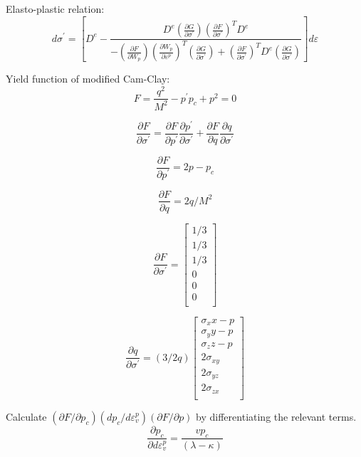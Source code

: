 \documentclass[a4paper,12pt]{article}
\begin{document}
Elasto-plastic relation:
\begin{equation*}
d\sigma^\prime = \left[D^e - \frac{D^e\left(\frac{\partial G}{\partial \sigma^\prime}\right)\left(\frac{\partial F}{\partial \sigma^\prime}\right)^T D^e}{-\left(\frac{\partial F}{\partial W_p}\right)\left(\frac{\partial W_p}{ \partial \varepsilon^p}\right)^T\left(\frac{\partial G}{\partial \sigma^\prime}\right) + \left(\frac{\partial F}{\partial \sigma^\prime}\right)^T D^e \left(\frac{\partial G}{\partial \sigma^\prime}\right)}\right] d\varepsilon
\end{equation*}

Yield function of modified Cam-Clay:
\begin{equation*}
F = \frac{q^2}{M^2} - p^\prime p_c + p^2 = 0
\end{equation*}

\begin{equation*}
\frac{\partial F}{\partial \sigma^\prime} = \frac{\partial F}{\partial p^\prime}\frac{\partial p^\prime}{\partial \sigma^\prime} + \frac{\partial F}{\partial q}\frac{\partial q}{\partial \sigma^\prime}
\end{equation*}

\begin{equation*}
\frac{\partial F}{\partial p^\prime} = 2 p - p_c
\end{equation*}

\begin{equation*}
\frac{\partial F}{\partial q} = 2q / M^2
\end{equation*}

\begin{equation*}
\frac{\partial F}{\partial \sigma^\prime} = \begin{bmatrix}
1/3 \\
1/3 \\
1/3 \\
0 \\
0 \\
0 \\
\end{bmatrix}
\end{equation*}

\begin{equation*}
\frac{\partial q}{\partial \sigma^\prime} = (3/2q) \begin{bmatrix}
\sigma_xx - p \\
\sigma_yy - p\\
\sigma_zz - p\\
2 \sigma_{xy} \\
2 \sigma_{yz} \\
2 \sigma_{zx} \\
\end{bmatrix}
\end{equation*}

Calculate $(\partial F / \partial p_c)(dp_c/d\varepsilon_v^p)(\partial F/\partial p)$ by differentiating the relevant terms.
\begin{equation*}
\frac{\partial p_c}{\partial d\varepsilon_v^p} = \frac{vp_c}{(\lambda - \kappa)}
\end{equation*}
\end{document}

